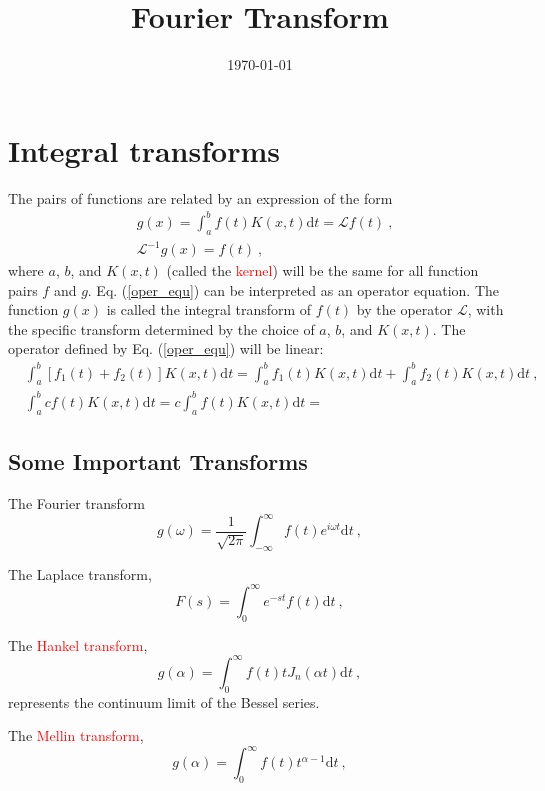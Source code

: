 \documentclass[12pt,a4paper]{article}
\title{Fourier Transform}
\author{}
\date{\today}
\newcommand{\dif}{\mathrm{d}}
\begin{document}
\maketitle

\section{Integral transforms}
The pairs of functions are related by an expression of the form
\begin{align}
\label{oper_equ}
& g(x) = \int_a^b f(t) K(x, t) \dif t = \mathcal L f(t) ~, \\
&  \mathcal L^{-1} g(x) = f(t) ~,
\end{align}
where $a$, $b$, and $K(x,t)$ (called the \textcolor{red}{kernel}) will be the same for all function pairs $f$ and $g$. Eq. (\ref{oper_equ}) can be interpreted as an operator equation. The function $g(x)$ is called the integral transform of $f(t)$ by the operator $\mathcal L$, with the specific transform determined by the choice of $a$, $b$, and $K(x,t)$. The operator defined by Eq. (\ref{oper_equ}) will be linear:
\begin{align}
& \int_a^b [f_1(t) +f_2(t)] K(x, t) \dif t = \int_a^b f_1(t) K(x, t) \dif t + \int_a^b f_2(t) K(x, t) \dif t ~, \\
& \int_a^b c f(t) K(x, t) \dif t = c \int_a^b f(t) K(x, t) \dif t =
\end{align}

\subsection{Some Important Transforms}
The Fourier transform
\begin{equation}
g(\omega) = \dfrac{1}{\sqrt{2\pi} } \int_{-\infty}^\infty f(t) e^{i\omega t} \dif t ~,
\end{equation}

The Laplace transform,
\begin{equation}
F(s) = \int_0^\infty e^{-st} f(t) \dif t ~,
\end{equation}



The \textcolor{red}{Hankel transform},
\begin{equation}
g(\alpha) = \int_0^\infty f(t) t J_n(\alpha t) \dif t ~,
\end{equation}
represents the continuum limit of the Bessel series. 

The \textcolor{red}{Mellin transform},
\begin{equation}
g(\alpha) = \int_0^\infty f(t) t^{\alpha-1} \dif t ~,
\end{equation}
\end{document}
